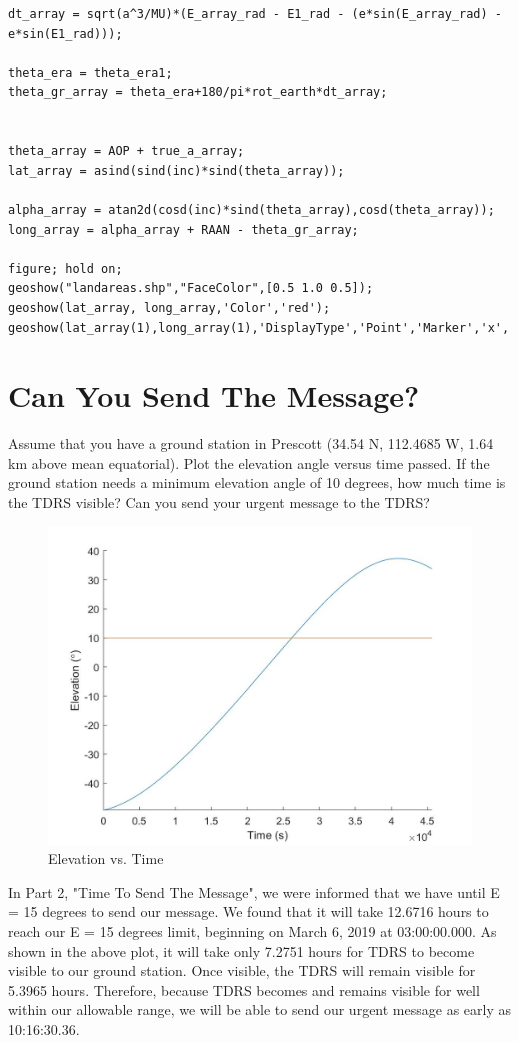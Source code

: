 \documentclass[hidelinks,12pt]{article}
\begin{document}
\begin{flushleft}
\begin{lstlisting}[frame=lines,style=Matlab-editor,basicstyle = \mlttfamily]
dt_array = sqrt(a^3/MU)*(E_array_rad - E1_rad - (e*sin(E_array_rad) - e*sin(E1_rad)));

theta_era = theta_era1;
theta_gr_array = theta_era+180/pi*rot_earth*dt_array;


theta_array = AOP + true_a_array;
lat_array = asind(sind(inc)*sind(theta_array));

alpha_array = atan2d(cosd(inc)*sind(theta_array),cosd(theta_array));
long_array = alpha_array + RAAN - theta_gr_array;

figure; hold on;
geoshow("landareas.shp","FaceColor",[0.5 1.0 0.5]);
geoshow(lat_array, long_array,'Color','red');
geoshow(lat_array(1),long_array(1),'DisplayType','Point','Marker','x','Markersize',20);
\end{lstlisting}
\newpage
\section{Can You Send The Message?}
Assume that you have a ground station in Prescott (34.54 N, 112.4685 W, 1.64 km above mean equatorial). Plot the elevation angle versus time passed. If the ground station needs a minimum elevation angle of 10 degrees, how much time is the TDRS visible? Can you send your urgent message to the TDRS?\\
\begin{figure}[!htb]
  \center
  \includegraphics[scale=0.4]{ELEVATIONTIME}
  \caption{Elevation vs. Time}
  \label{}
\end{figure}
In Part 2, "Time To Send The Message", we were informed that we have until E = 15 degrees to send our message. We found that it will take 12.6716 hours to reach our E = 15 degrees limit, beginning on March 6, 2019 at 03:00:00.000. As shown in the above plot, it will take only 7.2751 hours for TDRS to become visible to our ground station. Once visible, the TDRS will remain visible for 5.3965 hours. Therefore, because TDRS becomes and remains visible for well within our allowable range, we will be able to send our urgent message as early as 10:16:30.36.

\end{flushleft}
\end{document}
